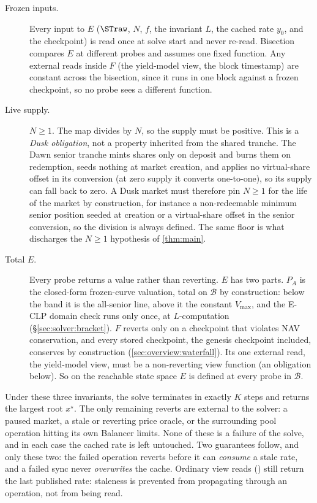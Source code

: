 \begin{description}
  \item[Frozen inputs.] Every input to $E$ ($\STraw$, $N$, $f$, the
    invariant $L$, the cached rate $y_0$, and the checkpoint) is read
    once at solve start and never re-read. Bisection compares $E$ at
    different probes and assumes one fixed function. Any external reads
    inside $F$ (the yield-model view, the block timestamp) are constant
    across the bisection, since it runs in one block against a frozen
    checkpoint, so no probe sees a different function.
  \item[Live supply.] $N \geq 1$. The map divides by $N$, so the supply
    must be positive. This is a \emph{Dusk obligation}, not a property
    inherited from the shared tranche. The Dawn senior tranche mints
    shares only on deposit and burns them on redemption, seeds nothing at
    market creation, and applies no virtual-share offset in its
    conversion (at zero supply it converts one-to-one), so its supply can
    fall back to zero. A Dusk market must therefore pin $N \geq 1$ for the
    life of the market by construction, for instance a non-redeemable
    minimum senior position seeded at creation or a virtual-share offset
    in the senior conversion, so the division is always defined. The
    same floor is what discharges the $N \geq 1$ hypothesis of
    \cref{thm:main}.
  \item[Total $E$.] Every probe returns a value rather than reverting.
    $E$ has two parts. $P_A$ is the closed-form frozen-curve valuation,
    total on $\mathcal{B}$ by construction: below the band it is the
    all-senior line, above it the constant $V_{\max}$, and the E-CLP
    domain check runs only once, at $L$-computation
    (\S\ref{sec:solver:bracket}). $F$ reverts only on a checkpoint that
    violates NAV conservation, and every stored checkpoint, the genesis
    checkpoint included, conserves by construction
    (\cref{sec:overview:waterfall}). Its one external read, the
    yield-model view, must be a non-reverting view function (an
    obligation below). So on the reachable state space $E$
    is defined at every probe in $\mathcal{B}$.
\end{description}

Under these three invariants, the solve terminates in exactly $K$ steps
and returns the largest root $x^\star$. The only remaining reverts are external to
the solver: a paused market, a stale or reverting price oracle, or the
surrounding pool operation hitting its own Balancer limits. None of these
is a failure of the solve, and in each case the cached rate is left
untouched. Two guarantees follow, and only these two: the failed
operation reverts before it can \emph{consume} a stale rate, and a
failed sync never \emph{overwrites} the cache. Ordinary view reads
() still return the last published rate: staleness is
prevented from propagating through an operation, not from being read.

